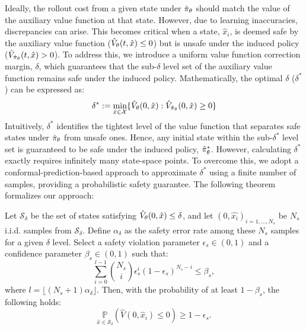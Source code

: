 Ideally, the rollout cost from a given state under $\hat{\pi}_{\theta}$ should match the value of the auxiliary value function at that state. However, due to learning inaccuracies, discrepancies can arise. This becomes critical when a state, $\hat{x}_i$, is deemed safe by the auxiliary value function ($\hat{V}_{\theta}(t, \hat{x}) \leq 0$) but is unsafe under the induced policy ($\hat{V}_{\hat{\pi}_{\theta}}(t, \hat{x}) > 0$). To address this, we introduce a uniform value function correction margin, $\delta$, which guarantees that the sub-$\delta$ level set of the auxiliary value function remains safe under the induced policy. 
Mathematically, the optimal $\delta$ ($\delta^*$) can be expressed as:
% 
\begin{equation}
    \delta^* := \min_{\hat{x} \in \mathcal{X}}\{\hat{V}_{\theta}(0, \hat{x}): \hat{V}_{\hat{\pi}_{\theta}}(0, \hat{x}) \geq 0\}
\end{equation}
%
Intuitively, $\delta^*$ identifies the tightest level of the value function that separates safe states under $\hat{\pi}_{\theta}$ from unsafe ones. Hence, any initial state within the sub-$\delta^*$ level set is guaranteed to be safe under the induced policy, $\hat{\pi}_{\theta}^*$. However, calculating $\delta^*$ exactly requires infinitely many state-space points. To overcome this, we adopt a conformal-prediction-based approach to approximate $\delta^*$ using a finite number of samples, providing a probabilistic safety guarantee. The following theorem formalizes our approach:

\begin{theorem}\label{thm: safety_verification}
Let $\mathcal{S}_{\delta}$ be the set of states satisfying $\hat{V}_{\theta}(0, \hat{x}) \leq \delta$, and let $(0, \hat{x_i})_{i=1, \dots, N_s}$ be $N_s$ i.i.d. samples from $\mathcal{S}_{\delta}$. Define $\alpha_{\delta}$ as the safety error rate among these $N_s$ samples for a given $\delta$ level. Select a safety violation parameter $\epsilon_s \in (0,1)$ and a confidence parameter $\beta_s \in (0,1)$ such that:
\begin{equation} \label{eq: safe_eps_calc}
    \sum_{i=0}^{l-1} \binom{N_s}{i} \epsilon_s^i (1 - \epsilon_s)^{N_s - i} \leq \beta_s,
\end{equation}
where \( l = \lfloor (N_s+1)\alpha_{\delta} \rfloor \). Then, with the probability of at least $1 - \beta_s$, the following holds:
\begin{equation}
    \underset{\hat{x} \in \mathcal{S}_{\delta}}{\mathbb{P}}\left(\hat{V}(0, \hat{x}_i) \leq 0 \right) \geq 1-\epsilon_s.
\end{equation}
\end{theorem}

